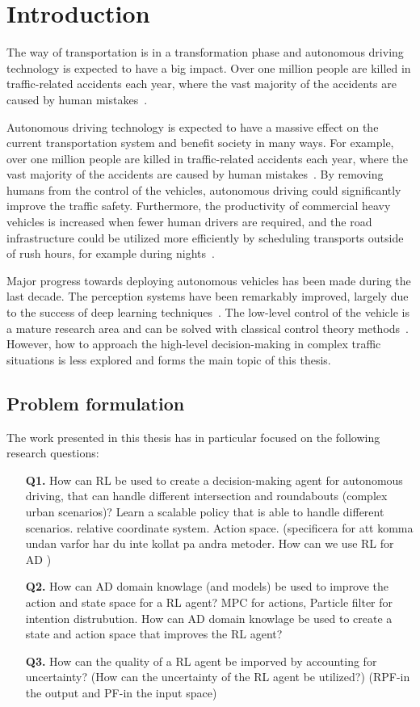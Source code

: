 \chapter{Introduction}\label{chapter:intro}
The way of transportation is in a transformation phase and autonomous driving technology is expected to have a big impact. Over one million people are killed in traffic-related accidents each year, where the vast majority of the accidents are caused by human mistakes~\cite{WHO2018, NHTSA2018}. 

Autonomous driving technology is expected to have a massive effect on the current transportation system and benefit society in many ways. For example, over one million people are killed in traffic-related accidents each year, where the vast majority of the accidents are caused by human mistakes~\cite{WHO2018, NHTSA2018}. By removing humans from the control of the vehicles, autonomous driving could significantly improve the traffic safety. Furthermore, the productivity of commercial heavy vehicles is increased when fewer human drivers are required, and the road infrastructure could be utilized more efficiently by scheduling transports outside of rush hours, for example during nights~\cite{FAGNANT2015167}.

Major progress towards deploying autonomous vehicles has been made during the last decade. The perception systems have been remarkably improved, largely due to the success of deep learning techniques~\cite{Janai2020}. The low-level control of the vehicle is a mature research area and can be solved with classical control theory methods~\cite{Paden2016}. However, how to approach the high-level decision-making in complex traffic situations is less explored and forms the main topic of this thesis.

\section{Problem formulation}
The work presented in this thesis has in particular focused on the following research questions:
\begin{enumerate}
	\item[\textbf{Q1.}] How can RL be used to create a decision-making agent for autonomous driving, that can handle different intersection and roundabouts (complex urban scenarios)? Learn a scalable policy that is able to handle different scenarios. relative coordinate system. Action space. 
	(specificera for att komma undan varfor har du inte kollat pa andra metoder. How can we use RL for AD )
	\item[\textbf{Q2.}] How can AD domain knowlage (and models) be used to improve the action and state space for a RL agent? MPC for actions, Particle filter for intention distrubution. How can AD domain knowlage be used to create a state and action space that improves the RL agent?
	\item[\textbf{Q3.}] How can the quality of a RL agent be imporved by accounting for uncertainty?
	(How can the uncertainty of the RL agent be utilized?) (RPF-in the output and PF-in the input space)
\end{enumerate}



